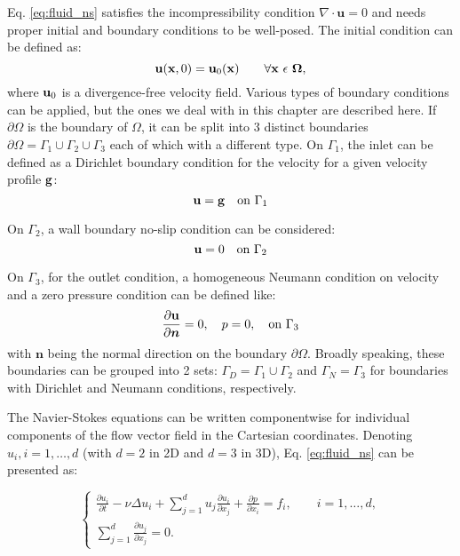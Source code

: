Eq. \ref{eq:fluid_ns} satisfies the incompressibility condition $\nabla\cdot\mathbf{u}=0$ and needs proper initial and boundary conditions to be well-posed. The initial condition can be defined as:
\begin{equation}
{\bf u}({\bf x},0)={\bf u}_{0}({\bf x})\qquad \forall{\bf x}\ \epsilon\ {\bf \Omega,}
\end{equation}
where ${\bf u}_{0}$ is a divergence-free velocity field. Various types of boundary conditions can be applied, but the ones we deal with in this chapter are described here. If $\partial \Omega$ is the boundary of $\Omega$, it can be split into 3 distinct boundaries $\partial \Omega=\Gamma_{1} \cup \Gamma_{2} \cup \Gamma_{3}$ each of which with a different type. On $\Gamma_{1}$, the inlet can be defined as a Dirichlet boundary condition for the velocity for a given velocity profile ${\bf g}$:
\begin{equation}
{\bf u} = {\bf g} \quad \text{on } \Gamma_1
\end{equation}

On $\Gamma_2$, a wall boundary no-slip condition can be considered:
\begin{equation}
{\bf u} = 0 \quad \text{on } \Gamma_2
\end{equation}

On $\Gamma_3$, for the outlet condition, a homogeneous Neumann condition on velocity and a zero pressure condition can be defined like:
\begin{equation} \label{eq:fluid_gamma3}
\frac{\partial {\bf u}}{\partial \boldsymbol{n}} = 0, \quad p = 0, \quad \text{on } \Gamma_3
\end{equation}
with $\boldsymbol{n}$ being the normal direction on the boundary $\partial \Omega$. Broadly speaking, these boundaries can be grouped into 2 sets: $\Gamma_{D} = \Gamma_{1} \cup \Gamma_{2}$ and $\Gamma_{N} = \Gamma_{3}$ for boundaries with Dirichlet and Neumann conditions, respectively.

The Navier-Stokes equations can be written componentwise for individual components of the flow vector field in the Cartesian coordinates. Denoting $u_i, i=1,\ldots,d$ (with $d=2$ in 2D and $d=3$ in 3D), Eq. \ref{eq:fluid_ns} can be presented as:

\begin{equation}
\left\{ {\begin{array}{*{20}{l}}
\displaystyle  {\frac{{\partial {u_i}}}{{\partial t}} - \nu \Delta {u_i} + \mathop \sum \limits_{j = 1}^d {u_j}\frac{{\partial {u_i}}}{{\partial {x_j}}} + \frac{{\partial p}}{{\partial {x_i}}} = {f_i},\qquad i = 1, \ldots ,d,} \\
\displaystyle  {\mathop \sum \limits_{j = 1}^d \frac{{\partial {u_j}}}{{\partial {x_j}}} = 0.}
\end{array}} \right.
\end{equation}


